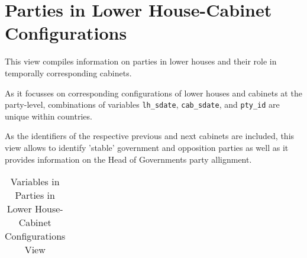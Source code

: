 \section{Parties in Lower House-Cabinet Configurations}\label{sec_parties_in_lh_cab_configurations}
This view compiles information on parties in lower houses and their role in temporally corresponding cabinets.

As it focusses on corresponding configurations of lower houses and cabinets at the party-level, combinations of  variables \texttt{\footnotesize lh\_sdate}, \texttt{\footnotesize cab\_sdate}, and \texttt{\footnotesize pty\_id} are unique within countries.

As the identifiers of the respective previous and next cabinets are included, this view allows to identify 'stable' government and opposition parties as well as it provides information on the Head of Governments party allignment.

\begin{center}
\begin{longtable}{L{4cm} L{6cm} L{3cm}}
\caption{Variables in Parties in Lower House-Cabinet Configurations View\label{tab_parties_in_lh_cab_configurations}}


\end{longtable}
\end{center}

